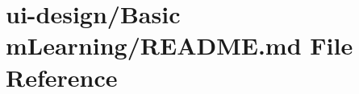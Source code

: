 \hypertarget{Basic_01mLearning_2README_8md}{}\section{ui-\/design/\+Basic m\+Learning/\+R\+E\+A\+D\+ME.md File Reference}
\label{Basic_01mLearning_2README_8md}
